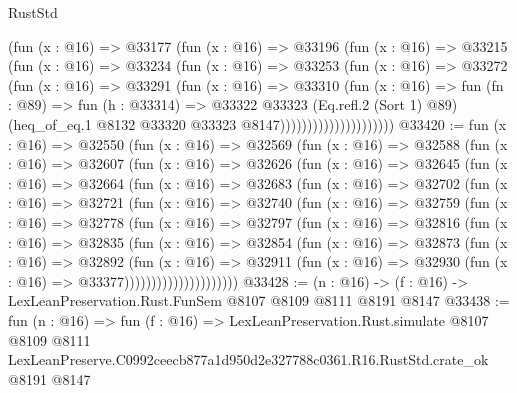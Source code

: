 \begin{lexlean}{RustStd}
\begin{coremodule}
                          (fun (x : @16) =>
                          @33177
                            (fun (x : @16) =>
                            @33196
                              (fun (x : @16) =>
                              @33215
                                (fun (x : @16) =>
                                @33234
                                  (fun (x : @16) =>
                                  @33253
                                    (fun (x : @16) =>
                                    @33272
                                      (fun (x : @16) =>
                                      @33291
                                        (fun (x : @16) =>
                                        @33310
                                          (fun (x : @16) =>
                                          fun (fn : @89) =>
                                          fun (h : @33314) =>
                                          @33322
                                            @33323
                                            (Eq.refl.{2} (Sort 1) @89)
                                            (heq_of_eq.{1}
                                              @8132
                                              @33320
                                              @33323
                                              @8147)))))))))))))))))))))
@33420 := fun (x : @16) =>
  @32550
    (fun (x : @16) =>
    @32569
      (fun (x : @16) =>
      @32588
        (fun (x : @16) =>
        @32607
          (fun (x : @16) =>
          @32626
            (fun (x : @16) =>
            @32645
              (fun (x : @16) =>
              @32664
                (fun (x : @16) =>
                @32683
                  (fun (x : @16) =>
                  @32702
                    (fun (x : @16) =>
                    @32721
                      (fun (x : @16) =>
                      @32740
                        (fun (x : @16) =>
                        @32759
                          (fun (x : @16) =>
                          @32778
                            (fun (x : @16) =>
                            @32797
                              (fun (x : @16) =>
                              @32816
                                (fun (x : @16) =>
                                @32835
                                  (fun (x : @16) =>
                                  @32854
                                    (fun (x : @16) =>
                                    @32873
                                      (fun (x : @16) =>
                                      @32892
                                        (fun (x : @16) =>
                                        @32911
                                          (fun (x : @16) =>
                                          @32930 (fun (x : @16) => @33377)))))))))))))))))))))
@33428 := (n : @16) -> (f : @16) -> LexLeanPreservation.Rust.FunSem @8107 @8109 @8111 @8191 @8147
@33438 := fun (n : @16) =>
  fun (f : @16) =>
  LexLeanPreservation.Rust.simulate
    @8107
    @8109
    @8111
    LexLeanPreserve.C0992ceecb877a1d950d2e327788c0361.R16.RustStd.crate_ok
    @8191
    @8147
\end{coremodule}
\end{lexlean}
